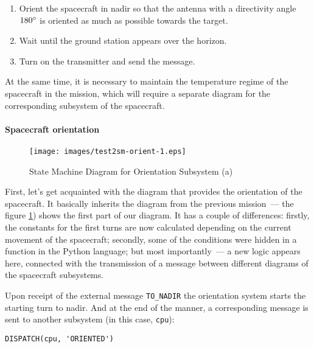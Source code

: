 \documentclass[12pt,a4paper]{article}
\begin{document}
\begin{enumerate}
\item Orient the spacecraft in nadir so that the antenna with a directivity angle
  $180\degree$ is oriented as much as possible towards the target.
\item Wait until the ground station appears over the horizon.
\item Turn on the transmitter and send the message.
\end{enumerate}

At the same time, it is necessary to maintain the temperature regime of the spacecraft in the mission, which will require a separate diagram for the corresponding subsystem of the spacecraft.

\paragraph{Spacecraft orientation}

\begin{figure}[tbh]
  \begin{center}
    \texttt{[image: images/test2sm-orient-1.eps]}
    \caption{State Machine Diagram for Orientation Subsystem (a)}
    \label{Pic:Test2SM-Orient-1}
  \end{center}
\end{figure}

First, let's get acquainted with the diagram that provides the orientation of the spacecraft. It basically inherits the diagram from the previous mission~--- the figure \ref{Pic:Test2SM-Orient-1}) shows the first part of our diagram. It has a couple of differences: firstly, the constants for the first
turns are now calculated depending on the current movement of the spacecraft; secondly, some of the conditions were hidden in a function in the Python language; but most importantly~--- a new logic appears here, connected with the transmission of a message between different diagrams of the spacecraft subsystems.

Upon receipt of the external message \verb'TO_NADIR' the orientation system starts the starting turn to nadir. And at the end of the manner, a corresponding message is sent to another subsystem (in this case, \verb'cpu'):

\begin{center}
\begin{verbatim}
DISPATCH(cpu, 'ORIENTED')
\end{verbatim}
\end{center}
\end{document}
